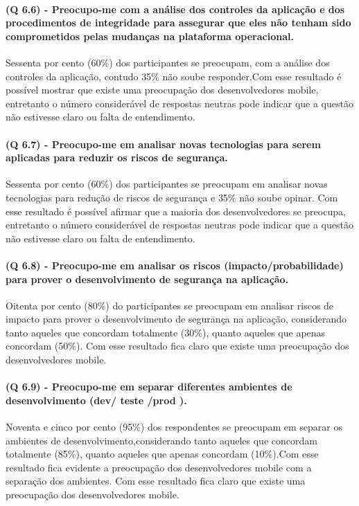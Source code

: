 \paragraph{\textbf{(Q 6.6)} - Preocupo-me com a análise dos controles da aplicação e dos procedimentos de integridade para assegurar que eles não tenham sido comprometidos pelas mudanças na plataforma operacional.}

Sessenta por cento (60{\%}) dos participantes se preocupam, com a análise dos controles da aplicação, contudo {35\%} não soube responder.Com esse resultado é possível mostrar que existe uma preocupação dos desenvolvedores mobile, entretanto o número considerável de respostas neutras pode indicar que a questão não estivesse claro ou falta de entendimento.

\paragraph{\textbf{(Q 6.7)} - Preocupo-me em analisar novas tecnologias para serem aplicadas para reduzir os riscos de segurança.}

Sessenta por cento (60{\%}) dos participantes se preocupam em analisar novas tecnologias para redução de riscos de segurança e {35\%} não soube opinar. Com esse resultado é possível afirmar que a maioria dos desenvolvedores se preocupa, entretanto o número considerável de respostas neutras pode indicar que a questão não estivesse claro ou falta de entendimento.

\paragraph{\textbf{(Q 6.8)} - Preocupo-me em analisar os riscos (impacto/probabilidade) para prover o desenvolvimento de segurança na aplicação.}

Oitenta por cento (80{\%}) do participantes se preocupam em analisar riscos de impacto para prover o desenvolvimento de segurança na aplicação, considerando tanto aqueles que concordam totalmente (30{\%}), quanto aqueles que apenas concordam (50{\%}). Com esse resultado fica claro que existe uma preocupação dos desenvolvedores mobile.

\paragraph{\textbf{(Q 6.9)} - Preocupo-me em separar diferentes ambientes de desenvolvimento (dev/ teste /prod ).}

Noventa e cinco por cento (95{\%}) dos respondentes se preocupam em separar os ambientes de desenvolvimento,considerando tanto aqueles que concordam totalmente (85{\%}), quanto aqueles que apenas concordam (10{\%}).Com esse resultado fica evidente a preocupação dos desenvolvedores mobile com a separação dos ambientes. Com esse resultado fica claro que existe uma preocupação dos desenvolvedores mobile.

